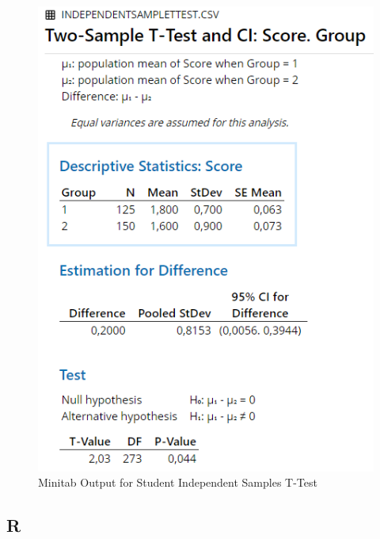 \documentclass[
]{book}
\newenvironment{Shaded}{\begin{snugshade}}{\end{snugshade}}
\newcommand{\DecValTok}[1]{\textcolor[rgb]{0.00,0.00,0.81}{#1}}
\newcommand{\KeywordTok}[1]{\textcolor[rgb]{0.13,0.29,0.53}{\textbf{#1}}}
\newcommand{\NormalTok}[1]{#1}
\newcommand{\OperatorTok}[1]{\textcolor[rgb]{0.81,0.36,0.00}{\textbf{#1}}}
\newcommand{\StringTok}[1]{\textcolor[rgb]{0.31,0.60,0.02}{#1}}
\begin{document}
\begin{figure}[!h]
\includegraphics{Screenshots/Independent Samples T test/isttMinitab2} \caption{\label{fig:isttMinitab2}Minitab Output for Student Independent Samples T-Test}\label{fig:isttMinitab2}
\end{figure}

\hypertarget{r}{%
\subsection{R}\label{r}}

\begin{Shaded}
\end{Shaded}
\end{document}
